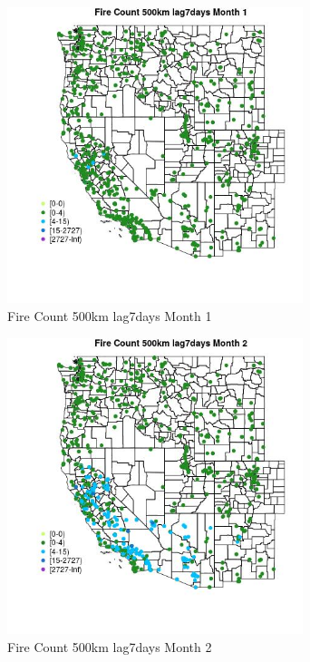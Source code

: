 \begin{figure} 
\centering  
\includegraphics[width=0.77\textwidth]{Code_Outputs/Report_ML_input_PM25_Step4_part_f_de_duplicated_aveswNAs_MapObsMo1Fire_Count_500km_lag7days.jpg} 
\caption{\label{fig:Report_ML_input_PM25_Step4_part_f_de_duplicated_aveswNAsMapObsMo1Fire_Count_500km_lag7days}Fire Count 500km lag7days Month 1} 
\end{figure} 
 

\begin{figure} 
\centering  
\includegraphics[width=0.77\textwidth]{Code_Outputs/Report_ML_input_PM25_Step4_part_f_de_duplicated_aveswNAs_MapObsMo2Fire_Count_500km_lag7days.jpg} 
\caption{\label{fig:Report_ML_input_PM25_Step4_part_f_de_duplicated_aveswNAsMapObsMo2Fire_Count_500km_lag7days}Fire Count 500km lag7days Month 2} 
\end{figure} 
 

